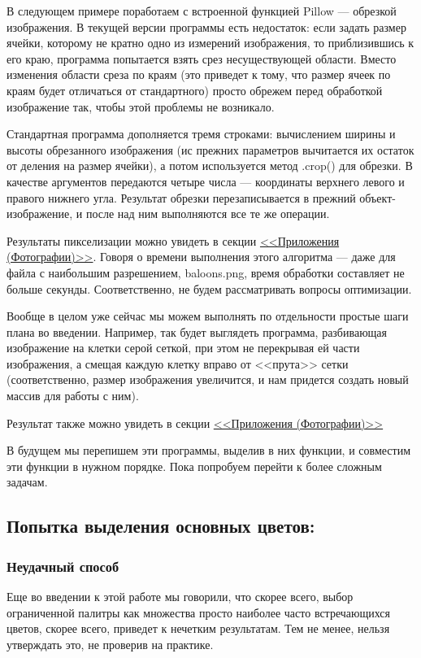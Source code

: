 \documentclass[12pt]{article}
\begin{document}
{	В следующем примере поработаем с встроенной функцией Pillow --- обрезкой изображения. В текущей версии программы есть недостаток: если задать размер ячейки, которому не кратно одно из измерений изображения, то приблизившись к его краю, программа попытается взять срез несуществующей области. Вместо изменения области среза по краям (это приведет к тому, что размер ячеек по краям будет отличаться от стандартного) просто обрежем перед обработкой изображение так, чтобы этой проблемы не возникало.
	
	
	
	Стандартная программа дополняется тремя строками: вычислением ширины и высоты обрезанного изображения (ис прежних параметров вычитается их остаток от деления на размер ячейки), а потом используется метод .crop() для обрезки. В качестве аргументов передаются четыре числа --- координаты верхнего левого и правого нижнего угла. Результат обрезки перезаписывается в прежний объект-изображение, и после над ним выполняются все те же операции. 
	
	Результаты пикселизации можно увидеть в секции \hyperref[pixel_cats]{<<Приложения (Фотографии)>>}. Говоря о времени выполнения этого алгоритма --- даже для файла с наибольшим разрешением, baloons.png, время обработки составляет не больше секунды. Соответственно, не будем рассматривать вопросы оптимизации.
	
	Вообще в целом уже сейчас мы можем выполнять по отдельности простые шаги плана во введении. Например, так будет выглядеть программа, разбивающая изображение на клетки серой сеткой, при этом не перекрывая ей части изображения, а смещая каждую клетку вправо от <<прута>> сетки (соответственно, размер изображения увеличится, и нам придется создать новый массив для работы с ним).
	
	
	
	Результат также можно увидеть в секции \hyperref[gridded_cats]{<<Приложения (Фотографии)>>}
	
	В будущем мы перепишем эти программы, выделив в них функции, и совместим эти функции в нужном порядке. Пока попробуем перейти к более сложным задачам.
	
	\subsection{Попытка выделения основных цветов:}
	
	\subsubsection{Неудачный способ}
	Еще во введении к этой работе мы говорили, что скорее всего, выбор ограниченной палитры как множества просто наиболее часто встречающихся цветов, скорее всего, приведет к нечетким результатам. Тем не менее, нельзя утверждать это, не проверив на практике.
	
}
\end{document}
